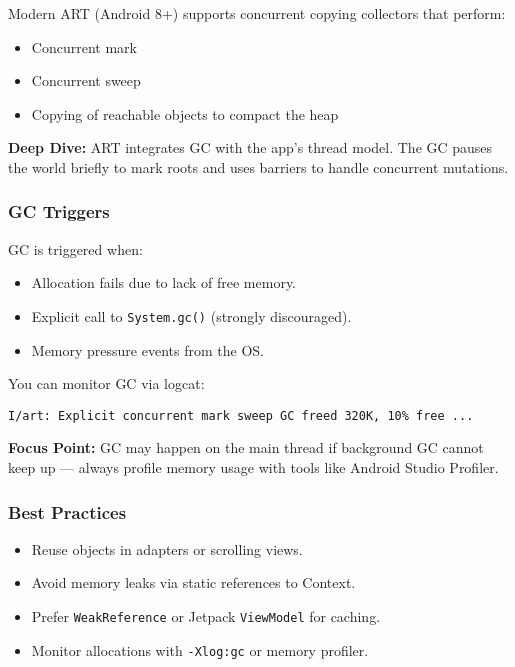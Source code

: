 \documentclass[a4paper,12pt]{article}
\begin{document}
Modern ART (Android 8+) supports concurrent copying collectors that perform:
\begin{itemize}
  \item Concurrent mark
  \item Concurrent sweep
  \item Copying of reachable objects to compact the heap
\end{itemize}

\textbf{Deep Dive:} ART integrates GC with the app's thread model. The GC pauses the world briefly to mark roots and uses barriers to handle concurrent mutations.

\subsubsection{GC Triggers}

GC is triggered when:
\begin{itemize}
  \item Allocation fails due to lack of free memory.
  \item Explicit call to \texttt{System.gc()} (strongly discouraged).
  \item Memory pressure events from the OS.
\end{itemize}

You can monitor GC via logcat:
\begin{verbatim}
I/art: Explicit concurrent mark sweep GC freed 320K, 10% free ...
\end{verbatim}

\textbf{Focus Point:} GC may happen on the main thread if background GC cannot keep up — always profile memory usage with tools like Android Studio Profiler.

\subsubsection{Best Practices}

\begin{itemize}
  \item Reuse objects in adapters or scrolling views.
  \item Avoid memory leaks via static references to Context.
  \item Prefer \texttt{WeakReference} or Jetpack \texttt{ViewModel} for caching.
  \item Monitor allocations with \texttt{-Xlog:gc} or memory profiler.
\end{itemize}
\end{document}
